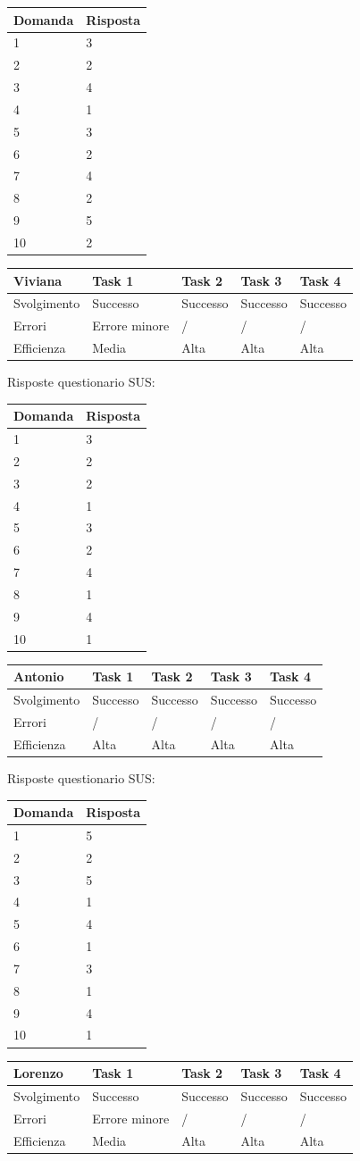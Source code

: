 \documentclass[12pt,italian,]{report}
\begin{document}
\begin{longtable}[]{@{}ll@{}}
\toprule
Domanda & Risposta\tabularnewline
\midrule
\endhead
1 & 3\tabularnewline
2 & 2\tabularnewline
3 & 4\tabularnewline
4 & 1\tabularnewline
5 & 3\tabularnewline
6 & 2\tabularnewline
7 & 4\tabularnewline
8 & 2\tabularnewline
9 & 5\tabularnewline
10 & 2\tabularnewline
\bottomrule
\end{longtable}

\begin{longtable}[]{@{}lllll@{}}
\toprule
Viviana & Task 1 & Task 2 & Task 3 & Task 4\tabularnewline
\midrule
\endhead
Svolgimento & Successo & Successo & Successo & Successo\tabularnewline
Errori & Errore minore & / & / & /\tabularnewline
Efficienza & Media & Alta & Alta & Alta\tabularnewline
\bottomrule
\end{longtable}

Risposte questionario SUS:

\begin{longtable}[]{@{}ll@{}}
\toprule
Domanda & Risposta\tabularnewline
\midrule
\endhead
1 & 3\tabularnewline
2 & 2\tabularnewline
3 & 2\tabularnewline
4 & 1\tabularnewline
5 & 3\tabularnewline
6 & 2\tabularnewline
7 & 4\tabularnewline
8 & 1\tabularnewline
9 & 4\tabularnewline
10 & 1\tabularnewline
\bottomrule
\end{longtable}

\begin{longtable}[]{@{}lllll@{}}
\toprule
Antonio & Task 1 & Task 2 & Task 3 & Task 4\tabularnewline
\midrule
\endhead
Svolgimento & Successo & Successo & Successo & Successo\tabularnewline
Errori & / & / & / & /\tabularnewline
Efficienza & Alta & Alta & Alta & Alta\tabularnewline
\bottomrule
\end{longtable}

Risposte questionario SUS:

\begin{longtable}[]{@{}ll@{}}
\toprule
Domanda & Risposta\tabularnewline
\midrule
\endhead
1 & 5\tabularnewline
2 & 2\tabularnewline
3 & 5\tabularnewline
4 & 1\tabularnewline
5 & 4\tabularnewline
6 & 1\tabularnewline
7 & 3\tabularnewline
8 & 1\tabularnewline
9 & 4\tabularnewline
10 & 1\tabularnewline
\bottomrule
\end{longtable}

\begin{longtable}[]{@{}lllll@{}}
\toprule
Lorenzo & Task 1 & Task 2 & Task 3 & Task 4\tabularnewline
\midrule
\endhead
Svolgimento & Successo & Successo & Successo & Successo\tabularnewline
Errori & Errore minore & / & / & /\tabularnewline
Efficienza & Media & Alta & Alta & Alta\tabularnewline
\bottomrule
\end{longtable}
\end{document}
